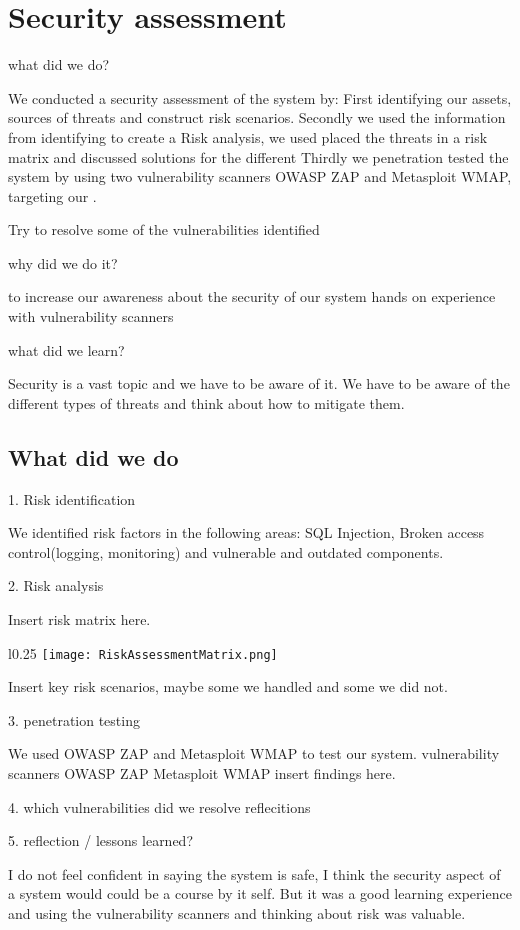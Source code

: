 \section{Security assessment}

what did we do?

    We conducted a security assessment of the system by:
    First identifying our assets, sources of threats and construct risk scenarios.
    Secondly we used the information from identifying to create a Risk analysis, we used placed the threats in a risk matrix and discussed solutions for the different 
    Thirdly we penetration tested the system by using two vulnerability scanners OWASP ZAP and Metasploit WMAP, targeting our .

    Try to resolve some of the vulnerabilities identified

why did we do it?

    to increase our awareness about the security of our system
    hands on experience with vulnerability scanners

what did we learn?

    Security is a vast topic and we have to be aware of it.
    We have to be aware of the different types of threats and think about how to mitigate them.


\subsection{What did we do}
1. Risk identification

    We identified risk factors in the following areas:
    SQL Injection, Broken access control(logging, monitoring) and vulnerable and outdated components.


2. Risk analysis

Insert risk matrix here.
\begin{wrapfigure}{l}{0.25\textwidth}
    \centering
    \texttt{[image: RiskAssessmentMatrix.png]}
\end{wrapfigure}

Insert key risk scenarios, maybe some we handled and some we did not.

3. penetration testing

    We used OWASP ZAP and Metasploit WMAP to test our system.
        vulnerability scanners
            OWASP ZAP
            Metasploit WMAP
    insert findings here.

    
4. which vulnerabilities did we resolve reflecitions

    
5. reflection / lessons learned?


I do not feel confident in saying the system is safe, I think the security aspect of a system would could be a course by it self.
But it was a good learning experience and using the vulnerability scanners and thinking about risk was valuable.

